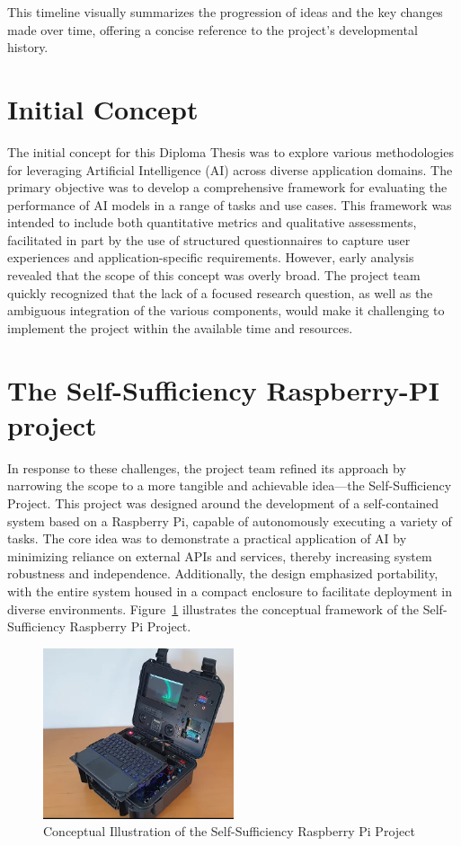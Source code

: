 This timeline visually summarizes the progression of ideas and the key changes made over time, offering a concise reference to the project's developmental history.

\section{Initial Concept}

The initial concept for this Diploma Thesis was to explore various methodologies for leveraging Artificial Intelligence (AI) across diverse application domains. The primary objective was to develop a comprehensive framework for evaluating the performance of AI models in a range of tasks and use cases. This framework was intended to include both quantitative metrics and qualitative assessments, facilitated in part by the use of structured questionnaires to capture user experiences and application-specific requirements. However, early analysis revealed that the scope of this concept was overly broad. The project team quickly recognized that the lack of a focused research question, as well as the ambiguous integration of the various components, would make it challenging to implement the project within the available time and resources.

\section{The Self-Sufficiency Raspberry-PI project}

In response to these challenges, the project team refined its approach by narrowing the scope to a more tangible and achievable idea—the Self-Sufficiency Project. This project was designed around the development of a self-contained system based on a Raspberry Pi, capable of autonomously executing a variety of tasks. The core idea was to demonstrate a practical application of AI by minimizing reliance on external APIs and services, thereby increasing system robustness and independence. Additionally, the design emphasized portability, with the entire system housed in a compact enclosure to facilitate deployment in diverse environments. Figure~\ref{fig:SelfSufficiencyProject} illustrates the conceptual framework of the Self-Sufficiency Raspberry Pi Project.

\begin{figure}[H]
    \centering
    \includegraphics[width=0.5\textwidth]{figures/SAIPIA-concept-picture.png}
    \caption{Conceptual Illustration of the Self-Sufficiency Raspberry Pi Project}
    \label{fig:SelfSufficiencyProject}
\end{figure}


